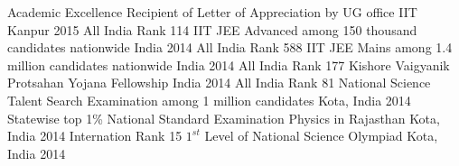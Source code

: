\begin{cvhonors}
  \cvhonor
    {Academic Excellence}
    {Recipient of Letter of Appreciation by UG office}
    {IIT Kanpur}
    {2015}
  \cvhonor
    {All India Rank 114}
    {IIT JEE Advanced among 150 thousand candidates nationwide}
    {India}
    {2014}
  \cvhonor
    {All India Rank 588}
    {IIT JEE Mains among 1.4 million candidates nationwide}
    {India}
    {2014}
  \cvhonor
    {All India Rank 177}
    {Kishore Vaigyanik Protsahan Yojana Fellowship}
    {India}
    {2014}
  \cvhonor
    {All India Rank 81}
    {National Science Talent Search Examination among 1 million candidates}
    {Kota, India}
    {2014}
  \cvhonor
    {Statewise top 1\%}
    {National Standard Examination Physics in Rajasthan}
    {Kota, India}
    {2014}
  \cvhonor
    {Internation Rank 15}
    {$1^{st}$ Level of National Science Olympiad}
    {Kota, India}
    {2014}

\end{cvhonors}
